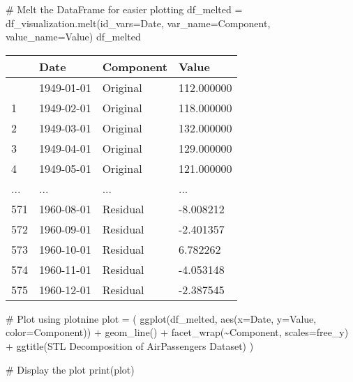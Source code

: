 \documentclass[
  letterpaper,
  DIV=11,
  numbers=noendperiod]{scrreprt}
\newenvironment{Shaded}{\begin{snugshade}}{\end{snugshade}}
\newcommand{\BuiltInTok}[1]{\textcolor[rgb]{0.00,0.23,0.31}{#1}}
\newcommand{\CommentTok}[1]{\textcolor[rgb]{0.37,0.37,0.37}{#1}}
\newcommand{\NormalTok}[1]{\textcolor[rgb]{0.00,0.23,0.31}{#1}}
\newcommand{\OperatorTok}[1]{\textcolor[rgb]{0.37,0.37,0.37}{#1}}
\newcommand{\StringTok}[1]{\textcolor[rgb]{0.13,0.47,0.30}{#1}}
\begin{document}
\begin{Shaded}
\begin{Highlighting}[]
\CommentTok{\# Melt the DataFrame for easier plotting}
\NormalTok{df\_melted }\OperatorTok{=}\NormalTok{ df\_visualization.melt(id\_vars}\OperatorTok{=}\StringTok{\textquotesingle{}Date\textquotesingle{}}\NormalTok{, var\_name}\OperatorTok{=}\StringTok{\textquotesingle{}Component\textquotesingle{}}\NormalTok{, value\_name}\OperatorTok{=}\StringTok{\textquotesingle{}Value\textquotesingle{}}\NormalTok{)}
\NormalTok{df\_melted}
\end{Highlighting}
\end{Shaded}

\begin{longtable}[]{@{}llll@{}}
\toprule\noalign{}
& Date & Component & Value \\
\midrule\noalign{}
\endhead
\bottomrule\noalign{}
\endlastfoot
0 & 1949-01-01 & Original & 112.000000 \\
1 & 1949-02-01 & Original & 118.000000 \\
2 & 1949-03-01 & Original & 132.000000 \\
3 & 1949-04-01 & Original & 129.000000 \\
4 & 1949-05-01 & Original & 121.000000 \\
... & ... & ... & ... \\
571 & 1960-08-01 & Residual & -8.008212 \\
572 & 1960-09-01 & Residual & -2.401357 \\
573 & 1960-10-01 & Residual & 6.782262 \\
574 & 1960-11-01 & Residual & -4.053148 \\
575 & 1960-12-01 & Residual & -2.387545 \\
\end{longtable}

\begin{Shaded}
\begin{Highlighting}[]
\CommentTok{\# Plot using plotnine}
\NormalTok{plot }\OperatorTok{=}\NormalTok{ (}
\NormalTok{    ggplot(df\_melted, aes(x}\OperatorTok{=}\StringTok{\textquotesingle{}Date\textquotesingle{}}\NormalTok{, y}\OperatorTok{=}\StringTok{\textquotesingle{}Value\textquotesingle{}}\NormalTok{, color}\OperatorTok{=}\StringTok{\textquotesingle{}Component\textquotesingle{}}\NormalTok{)) }\OperatorTok{+}
\NormalTok{    geom\_line() }\OperatorTok{+}
\NormalTok{    facet\_wrap(}\StringTok{\textquotesingle{}\textasciitilde{}Component\textquotesingle{}}\NormalTok{, scales}\OperatorTok{=}\StringTok{\textquotesingle{}free\_y\textquotesingle{}}\NormalTok{) }\OperatorTok{+}
\NormalTok{    ggtitle(}\StringTok{\textquotesingle{}STL Decomposition of AirPassengers Dataset\textquotesingle{}}\NormalTok{)}
\NormalTok{)}

\CommentTok{\# Display the plot}
\BuiltInTok{print}\NormalTok{(plot)}
\end{Highlighting}
\end{Shaded}
\end{document}
